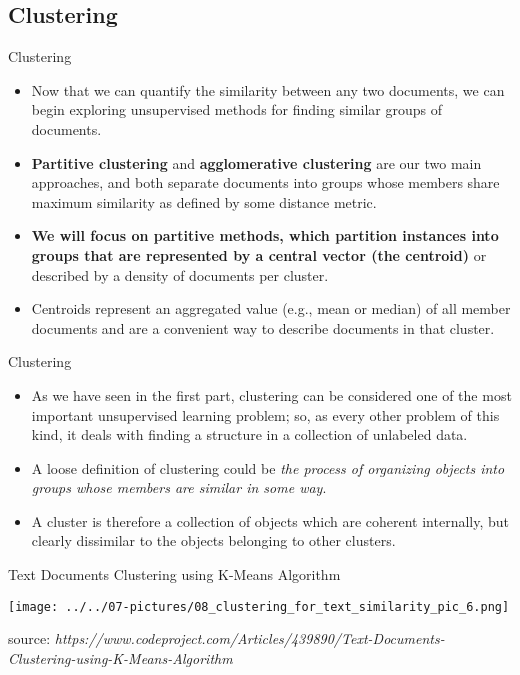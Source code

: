 \documentclass[11pt]{beamer}
\begin{document}
\subsection{Clustering \\ \scalebox{0.8}{}}
\begin{frame}{Clustering}
	\begin{itemize}
		\item Now that we can quantify the similarity between any two documents, we can begin exploring unsupervised methods for finding similar groups of documents. 
		\item \textbf{Partitive clustering} and \textbf{agglomerative clustering} are our two main approaches, and both separate documents into groups whose members share maximum similarity as defined by some distance metric.
		\item \textbf{We will focus on partitive methods, which partition instances into groups that are represented by a central vector (the centroid)} or described by a density of documents per cluster. 
		\item Centroids represent an aggregated value (e.g., mean or median) of all member documents and are a convenient way to describe documents in that cluster.
	\end{itemize}
\end{frame}
\begin{frame}{Clustering}
	\begin{itemize}
		\item As we have seen in the first part, clustering can be considered one of the most important unsupervised learning problem; so, as every other problem of this kind, it deals with finding a structure in a collection of unlabeled data. 
		\item A loose definition of clustering could be \textit{the process of organizing objects into groups whose members are similar in some way}. 
		\item A cluster is therefore a collection of objects which are coherent internally, but clearly dissimilar to the objects belonging to other clusters.
	\end{itemize}
\end{frame}
\begin{frame}{Text Documents Clustering using K-Means Algorithm }
	\begin{center}
	\texttt{[image: ../../07-pictures/08\_clustering\_for\_text\_similarity\_pic\_6.png]}
	\end{center}
	\footnotesize{source: \textit{https://www.codeproject.com/Articles/439890/Text-Documents-Clustering-using-K-Means-Algorithm}}
\end{frame}
\end{document}
